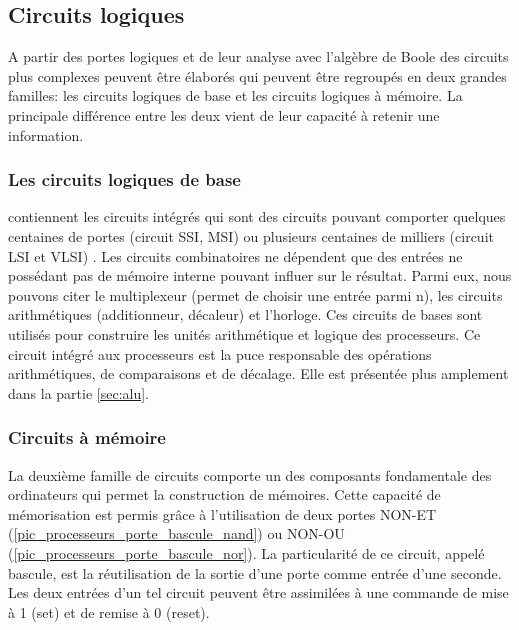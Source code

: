 \subsection{Circuits logiques}
A partir des portes logiques et de leur analyse avec l'algèbre de Boole des circuits plus complexes peuvent être élaborés qui peuvent être regroupés en deux grandes familles: les circuits logiques de base  et les circuits logiques à mémoire. La principale différence entre les deux vient de leur capacité à retenir une information. 

\subsubsection{Les circuits logiques de base}
contiennent les circuits intégrés qui sont des circuits pouvant comporter quelques centaines de portes (circuit SSI, MSI) ou plusieurs centaines de milliers (circuit LSI et VLSI) \cite{barbe2013very}.
Les circuits combinatoires ne dépendent que des entrées ne possédant pas de mémoire interne pouvant influer sur le résultat. Parmi eux, nous pouvons citer le multiplexeur (permet de choisir une entrée parmi n), les circuits arithmétiques (additionneur, décaleur) et l'horloge. 
Ces circuits de bases sont utilisés pour construire les unités arithmétique et logique des processeurs. Ce circuit intégré aux processeurs est la puce responsable des opérations arithmétiques, de comparaisons et de décalage. Elle est présentée plus amplement dans la partie \autoref{sec:alu}.


\subsubsection{Circuits à mémoire}
La deuxième famille de circuits comporte un des composants fondamentale des ordinateurs qui permet la construction de mémoires. Cette capacité de mémorisation est permis grâce à l'utilisation de deux portes NON-ET (\autoref{pic_processeurs_porte_bascule_nand}) ou NON-OU (\autoref{pic_processeurs_porte_bascule_nor}). La particularité de ce circuit, appelé bascule, est la réutilisation de la sortie d'une porte comme entrée d'une seconde. 
Les deux entrées d'un tel circuit peuvent être assimilées à une commande de mise à 1 (set) et de remise à 0 (reset).

